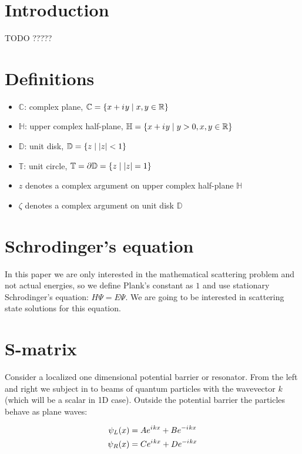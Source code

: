 \documentclass[12pt, a4paper]{article}
\theoremstyle{plain}
\newcommand{\bbC}{\mathbb{C}} %
\newcommand{\bbD}{\mathbb{D}} %
\newcommand{\bbR}{\mathbb{R}}
\newcommand{\bbT}{\mathbb{T}} %
\newcommand{\bbH}{\mathbb{H}}
\newcommand{\iu}{{i\mkern1mu}}
\newcommand{\eexp}[1]{e^{#1}}
\begin{document}
\section{Introduction}
TODO ?????

\section{Definitions}
\begin{itemize}
\item $\bbC$: complex plane, $\bbC = \{ x + \iu y \mid x, y \in \bbR \}$ 
\item $\bbH$: upper complex half-plane, $\bbH = \{ x + \iu y \mid y > 0, x, y \in \bbR \}$
\item $\bbD$: unit disk, $\bbD = \{ z \mid \abs{z} < 1 \}$
\item $\bbT$: unit circle, $\bbT = \partial \bbD =  \{z \mid \abs{z} = 1 \}$
\item $z$ denotes a complex argument on upper complex half-plane $\bbH$
\item $\zeta$ denotes a complex argument on unit disk $\bbD$
\end{itemize}

\section{Schrodinger's equation}
In this paper we are only interested in the mathematical scattering problem and not actual energies, so we define Plank's constant as $1$ and use stationary Schrodinger's equation: $H \Psi = E \Psi$. We are going to be interested in scattering state solutions for this equation.

\section{S-matrix}\label{sec:smatrix}
Consider a localized one dimensional potential barrier or resonator. From the left and right we subject in to beams of quantum particles with the wavevector $k$ (which will be a scalar in 1D case). Outside the potential barrier the particles behave as plane waves:

\begin{equation}\label{eq:wlwl}
\begin{aligned}
   \psi_L(x) &= A \eexp{\iu k x} + B \eexp{-\iu k x}
\\ \psi_R(x) &= C \eexp{\iu k x} + D \eexp{-\iu k x}
\end{aligned}
\end{equation}
\end{document}
